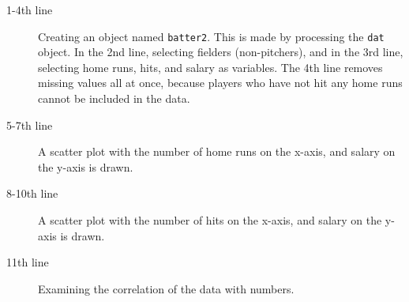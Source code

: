 \begin{description}
	\item[1-4th line] Creating an object named \texttt{batter2}. This is made by processing the \texttt{dat} object. In the 2nd line, selecting fielders (non-pitchers), and in the 3rd line, selecting home runs, hits, and salary as variables. The 4th line removes missing values all at once, because players who have not hit any home runs cannot be included in the data.
	\item[5-7th line] A scatter plot with the number of home runs on the x-axis, and salary on the y-axis is drawn.
	\item[8-10th line] A scatter plot with the number of hits on the x-axis, and salary on the y-axis is drawn.
	\item[11th line] Examining the correlation of the data with numbers.
\end{description}
